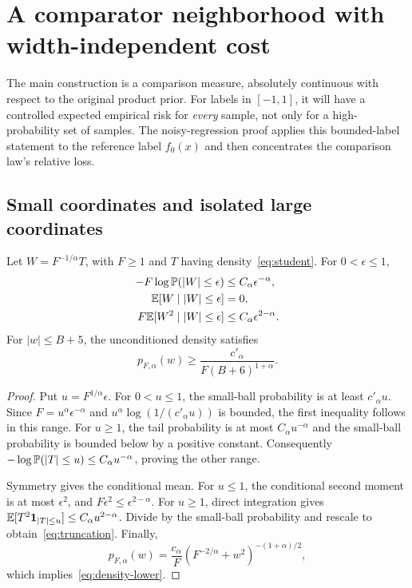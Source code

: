 \section{A comparator neighborhood with width-independent cost}\label{sec:comparison}
The main construction is a comparison measure, absolutely continuous with respect to the original product prior. For labels in $[-1,1]$, it will have a controlled expected empirical risk for \emph{every} sample, not only for a high-probability set of samples. The noisy-regression proof applies this bounded-label statement to the reference label $f_0(x)$ and then concentrates the comparison law's relative loss.

\subsection{Small coordinates and isolated large coordinates}
\begin{lemma}\label{lem:truncation}
Let $W=F^{-1/\alpha}T$, with $F\ge1$ and $T$ having density~\eqref{eq:student}. For $0<\epsilon\le1$,
\begin{align}
 -F\log\mathbb P(|W|\le\epsilon)&\le C_\alpha\epsilon^{-\alpha},\\
 \mathbb E[W\mid |W|\le\epsilon]&=0,\\
 F\mathbb E[W^2\mid |W|\le\epsilon]&\le C_\alpha\epsilon^{2-\alpha}.
 \label{eq:truncation}
\end{align}
For $|w|\le B+5$, the unconditioned density satisfies
\begin{equation}
 p_{F,\alpha}(w)\ge\frac{c'_\alpha}{F(B+6)^{1+\alpha}}.
 \label{eq:density-lower}
\end{equation}
\end{lemma}
\begin{proof}
Put $u=F^{1/\alpha}\epsilon$. For $0<u\le1$, the small-ball probability is at least $c'_\alpha u$. Since $F=u^\alpha\epsilon^{-\alpha}$ and $u^\alpha\log(1/(c'_\alpha u))$ is bounded, the first inequality follows in this range. For $u\ge1$, the tail probability is at most $C_\alpha u^{-\alpha}$ and the small-ball probability is bounded below by a positive constant. Consequently $-\log\mathbb P(|T|\le u)\le C_\alpha u^{-\alpha}$, proving the other range.

Symmetry gives the conditional mean. For $u\le1$, the conditional second moment is at most $\epsilon^2$, and $F\epsilon^2\le\epsilon^{2-\alpha}$. For $u\ge1$, direct integration gives $\mathbb E[T^2\mathbf1_{|T|\le u}]\le C_\alpha u^{2-\alpha}$. Divide by the small-ball probability and rescale to obtain~\eqref{eq:truncation}. Finally,
\[
 p_{F,\alpha}(w)=\frac{c_\alpha}{F}
 (F^{-2/\alpha}+w^2)^{-(1+\alpha)/2},
\]
which implies~\eqref{eq:density-lower}.
\end{proof}

